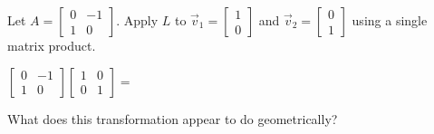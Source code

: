 \documentclass[10pt]{article}
\begin{document}
\begin{practicebox}
\small
Let $A = \begin{bmatrix}0 & -1 \\ 1 & 0\end{bmatrix}$.
Apply $L$ to $\vec{v}_1 = \begin{bmatrix}1\\0\end{bmatrix}$ and
$\vec{v}_2 = \begin{bmatrix}0\\1\end{bmatrix}$ using a single matrix product.

\vspace{0.08in}
$\begin{bmatrix}0 & -1 \\ 1 & 0\end{bmatrix}
\begin{bmatrix}1 & 0\\ 0 & 1\end{bmatrix} = $ \blank{4.5cm}

\vspace{0.08in}
What does this transformation appear to do geometrically?  \writeline
\end{practicebox}
\end{document}
